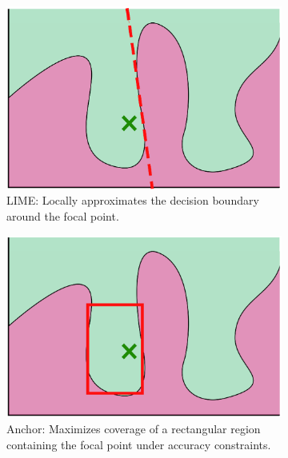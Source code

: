 \documentclass[runningheads]{llncs}
\begin{document}
\begin{figure}[tbp]
  \centering
  \begin{subfigure}[t]{0.3\textwidth}
    \centering
    \includegraphics[width=\textwidth]{visual-lime}
    \caption{%
      LIME\@: Locally approximates the decision boundary around the focal point.
    }\label{fig:lime}
  \end{subfigure}%
  \hspace{0.03\textwidth}
  \begin{subfigure}[t]{0.3\textwidth}
    \centering
    \includegraphics[width=\textwidth]{visual-anchor}
    \caption{%
      Anchor: Maximizes coverage of a rectangular region
      containing the focal point under accuracy constraints.
    }\label{fig:anchor}
  \end{subfigure}
  \hspace{0.03\textwidth}
  \begin{subfigure}[t]{0.3\textwidth}

\end{subfigure}
\end{figure}
\end{document}
